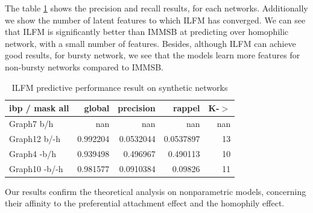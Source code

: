 The table \ref{table:ibp} shows the precision and recall results, for each networks. Additionally we show the number of latent features to which ILFM has converged. We can see that ILFM is significantly better than IMMSB at predicting over homophilic network, with a small number of features. Besides, although ILFM can achieve good results, for bursty network, we see that the models learn more features for non-bursty networks compared to IMMSB. 

\begin{table} \label{table:ibp}
\begin{tabular}{lrrrr}
\hline
 ibp / mask all   &     global &   precision &      rappel &   K-\ensuremath{>} \\
\hline
 Graph7 b/h       & nan        & nan         & nan         &   nan \\
 Graph12 b/-h     &   0.992204 &   0.0532044 &   0.0537897 &    13 \\
 Graph4 -b/h      &   0.939498 &   0.496967  &   0.490113  &    10 \\
 Graph10 -b/-h    &   0.981577 &   0.0910384 &   0.09826   &    11 \\
\hline
\end{tabular}  
    \caption{ILFM predictive performance result on synthetic networks}
\end{table}

Our results confirm the theoretical analysis on nonparametric models, concerning their affinity to the preferential attachment effect and the homophily effect.

